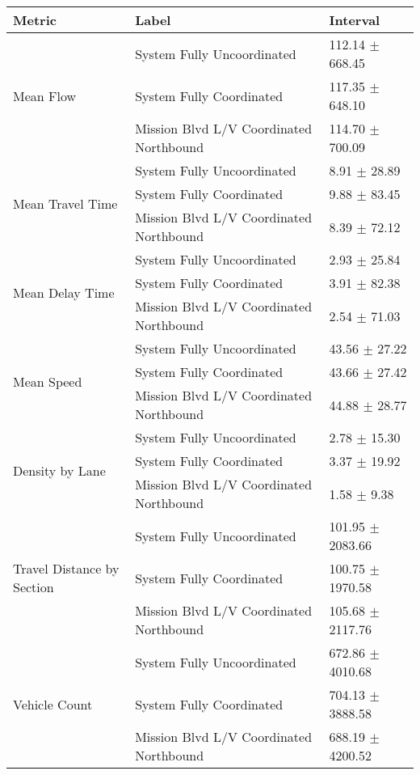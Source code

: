 \begin{tabular}{lll}
\toprule
Metric & Label & Interval \\
\midrule
\multirow[t]{3}{*}{Mean Flow} & System Fully Uncoordinated & 112.14 $\pm$ 668.45 \\
 & System Fully Coordinated & 117.35 $\pm$ 648.10 \\
 & Mission Blvd L/V Coordinated Northbound & 114.70 $\pm$ 700.09 \\
\multirow[t]{3}{*}{Mean Travel Time} & System Fully Uncoordinated & 8.91 $\pm$ 28.89 \\
 & System Fully Coordinated & 9.88 $\pm$ 83.45 \\
 & Mission Blvd L/V Coordinated Northbound & 8.39 $\pm$ 72.12 \\
\multirow[t]{3}{*}{Mean Delay Time} & System Fully Uncoordinated & 2.93 $\pm$ 25.84 \\
 & System Fully Coordinated & 3.91 $\pm$ 82.38 \\
 & Mission Blvd L/V Coordinated Northbound & 2.54 $\pm$ 71.03 \\
\multirow[t]{3}{*}{Mean Speed} & System Fully Uncoordinated & 43.56 $\pm$ 27.22 \\
 & System Fully Coordinated & 43.66 $\pm$ 27.42 \\
 & Mission Blvd L/V Coordinated Northbound & 44.88 $\pm$ 28.77 \\
\multirow[t]{3}{*}{Density by Lane} & System Fully Uncoordinated & 2.78 $\pm$ 15.30 \\
 & System Fully Coordinated & 3.37 $\pm$ 19.92 \\
 & Mission Blvd L/V Coordinated Northbound & 1.58 $\pm$ 9.38 \\
\multirow[t]{3}{*}{Travel Distance by Section} & System Fully Uncoordinated & 101.95 $\pm$ 2083.66 \\
 & System Fully Coordinated & 100.75 $\pm$ 1970.58 \\
 & Mission Blvd L/V Coordinated Northbound & 105.68 $\pm$ 2117.76 \\
\multirow[t]{3}{*}{Vehicle Count} & System Fully Uncoordinated & 672.86 $\pm$ 4010.68 \\
 & System Fully Coordinated & 704.13 $\pm$ 3888.58 \\
 & Mission Blvd L/V Coordinated Northbound & 688.19 $\pm$ 4200.52 \\
\bottomrule
\end{tabular}
